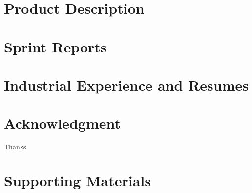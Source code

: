 \documentclass{book}
\begin{document}
\appendix

\chapter{Product Description}



\chapter{Sprint Reports}


\chapter{Industrial Experience and Resumes}


\chapter{Acknowledgment}
\label{SpecialThanks}  
Thanks  

\chapter{Supporting Materials}


\backmatter

%
\end{document}
